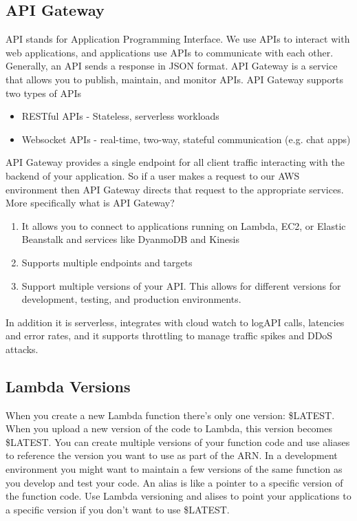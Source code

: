 \documentclass{article}%
\begin{document}
\subsection{API Gateway}
API stands for Application Programming Interface. We use APIs to interact with web applications, and applications use APIs to communicate with each other. Generally, an API sends a response in JSON format. 
API Gateway is a service that allows you to publish, maintain, and monitor APIs. API Gateway supports two types of APIs 
\begin{itemize}
    \item RESTful APIs - Stateless, serverless workloads
    \item Websocket APIs - real-time, two-way, stateful communication (e.g. chat apps)
\end{itemize}
API Gateway provides a single endpoint for all client traffic interacting with the backend of your application. So if a user makes a request to our AWS environment then API Gateway directs that request to the appropriate services. More specifically what is API Gateway?
\begin{enumerate}
    \item It allows you to connect to applications running on Lambda, EC2, or Elastic Beanstalk and services like DyanmoDB and Kinesis
    \item Supports multiple endpoints and targets
    \item Support multiple versions of your API. This allows for different versions for development, testing, and production environments.  
\end{enumerate} 
In addition it is serverless, integrates with cloud watch to logAPI calls, latencies and error rates, and it supports throttling to manage traffic spikes and DDoS attacks. 
\subsection{Lambda Versions}
When you create a new Lambda function there's only one version: \$LATEST. When you upload a new version of the code to Lambda, this version becomes \$LATEST. You can create multiple versions of your function code and use aliases to reference the version you want to use as part of the ARN. In a development environment you might want to maintain a few versions of the same function as you develop and test your code. An alias is like a pointer to a specific version of the function code. 
Use Lambda versioning and alises to point your applications to a specific version if you don't want to use \$LATEST. 
\end{document}

